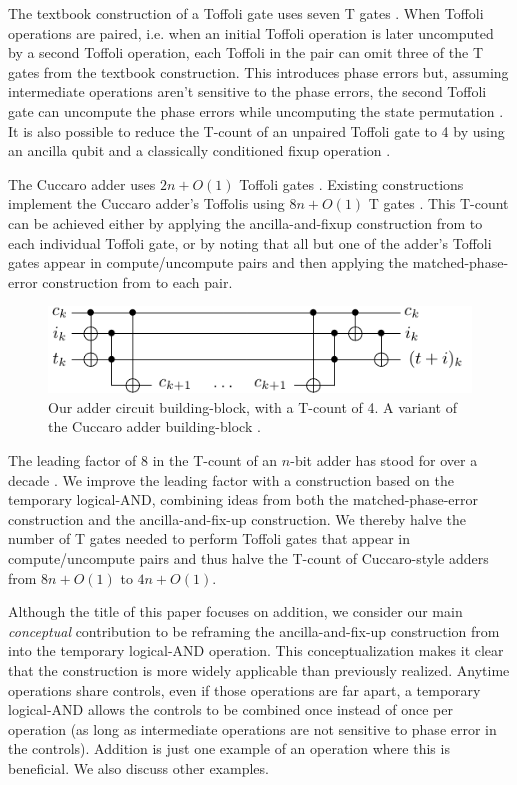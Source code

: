 \documentclass[twocolumn]{quantumarticle-customized}
\begin{document}
The textbook construction of a Toffoli gate uses seven T gates \cite{Nielsen2009}.
When Toffoli operations are paired, i.e. when an initial Toffoli operation is later uncomputed by a second Toffoli operation, each Toffoli in the pair can omit three of the T gates from the textbook construction.
This introduces phase errors but, assuming intermediate operations aren't sensitive to the phase errors, the second Toffoli gate can uncompute the phase errors while uncomputing the state permutation \cite{Barenco1995, Nielsen2009}.
It is also possible to reduce the T-count of an unpaired Toffoli gate to 4 by using an ancilla qubit and a classically conditioned fixup operation \cite{Jones2013}.

The Cuccaro adder uses $2n + O(1)$ Toffoli gates \cite{Cuccaro2004}.
Existing constructions implement the Cuccaro adder's Toffolis using $8n + O(1)$ T gates \cite{Barenco1995, Cuccaro2004, Amy2013}.
This T-count can be achieved either by applying the ancilla-and-fixup construction from \cite{Jones2013} to each individual Toffoli gate, or by noting that all but one of the adder's Toffoli gates appear in compute/uncompute pairs and then applying the matched-phase-error construction from \cite{Barenco1995, Nielsen2009} to each pair.

\begin{figure}
  \includegraphics[width=\linewidth]{adder-building-block.pdf}
  \caption{
	Our adder circuit building-block, with a T-count of 4.
	A variant of the Cuccaro adder building-block \cite{Cuccaro2004}.
  }
  \label{fig:adder-building-block}
\end{figure}

The leading factor of 8 in the T-count of an $n$-bit adder has stood for over a decade \cite{Barenco1995, Cuccaro2004, AustinDiscussionsAndEmails2017}.
We improve the leading factor with a construction based on the temporary logical-AND, combining ideas from both the matched-phase-error construction and the ancilla-and-fix-up construction.
We thereby halve the number of T gates needed to perform Toffoli gates that appear in compute/uncompute pairs and thus halve the T-count of Cuccaro-style adders from $8n + O(1)$ to $4n + O(1)$.

Although the title of this paper focuses on addition, we consider our main {\em conceptual} contribution to be reframing the ancilla-and-fix-up construction from \cite{Jones2013} into the temporary logical-AND operation.
This conceptualization makes it clear that the construction is more widely applicable than previously realized.
Anytime operations share controls, even if those operations are far apart, a temporary logical-AND allows the controls to be combined once instead of once per operation (as long as intermediate operations are not sensitive to phase error in the controls).
Addition is just one example of an operation where this is beneficial.
We also discuss other examples.
\end{document}
